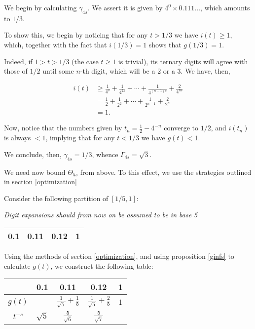 \documentclass[11pt, reqno]{amsart}
\begin{document}
We begin by calculating $\gamma_{4s}$. We assert it is given by $4^0 \times 0.111\dots$, which amounts to $1/3$.

To show this, we begin by noticing that for any $t > 1/3$ we have $i(t) \geq 1$, which, together with the fact that $i(1/3) = 1$ shows that $g(1/3) = 1$.

Indeed, if $1 > t > 1/3$ (the case $t \geq 1$ is trivial), its ternary digits will agree with those of $1/2$ until some $n$-th digit, which will be a $2$ or a $3$. We have, then,

\begin{align*}
i(t) &\geq \frac 1 {4^s} + \frac 1 {4^{2s}} + \cdots + \frac 1 {4^{(n-1)s}} + \frac 2 {4^{ns}} \\
&= \frac 1 {2} + \frac 1 {2^2} + \cdots + \frac 1 {2^{n-1}} + \frac 2 {2^n} \\
&= 1.
\end{align*}

Now, notice that the numbers given by $t_n = \frac 1 2 - 4^{-n}$ converge to $1/2$, and $i(t_n)$ is always $< 1$, implying that for any $t < 1/3$ we have $g(t) < 1$.

We conclude, then, $\gamma_{4s} = 1/3$, whence $\Gamma_{4s} = \sqrt 3$.

We need now bound $\Theta_{5s}$ from above. To this effect, we use the strategies outlined in section \ref{optimization}

Consider the following partition of $\left[1/5, 1 \right]$:

\emph{Digit expansions should from now on be assumed to be in base 5}

\begin{center}
\begin{tabular}{| c | @{\qquad\qquad} | c | @{\qquad\qquad} | c | @{\qquad\qquad} | c |}
\hline
0.1 & 0.11 & 0.12 & 1 \\
\hline
\end{tabular}
\end{center}

Using the methods of section \ref{optimization}, and using proposition \ref{ginfs} to calculate $g(t)$, we construct the following table:

\begin{center}
\tabulinesep=1.2mm
\begin{tabu}{| c | | c | @{\qquad\qquad} | c | @{\qquad\qquad} | c | @{\qquad\qquad} | c |}
\hline
& 0.1 & 0.11 & 0.12 & 1 \\
\hline
$g(t)$ & & $\frac 1 {\sqrt{5}} + \frac 1 5$ & $\frac 1 {\sqrt{5}} + \frac 2 5$ & $1$ \\
$t^{-s}$ & $\sqrt 5$ & $\frac 5 {\sqrt 6}$ & $\frac 5 {\sqrt 7}$ & \\
\hline
\end{tabu}
\end{center}
\end{document}
